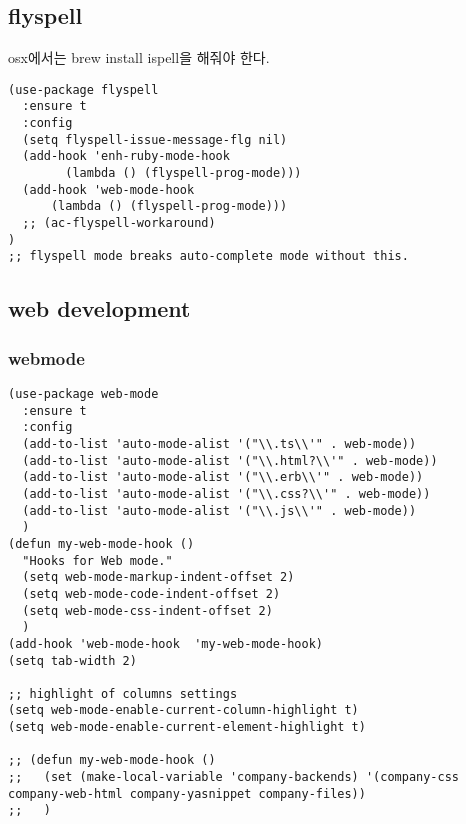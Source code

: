 \documentclass[11pt]{article}
\begin{document}
\subsection*{flyspell}
\label{sec:org152111b}
osx에서는 brew install ispell을 해줘야 한다.
\begin{verbatim}
(use-package flyspell
  :ensure t
  :config
  (setq flyspell-issue-message-flg nil)
  (add-hook 'enh-ruby-mode-hook
	    (lambda () (flyspell-prog-mode)))
  (add-hook 'web-mode-hook
	  (lambda () (flyspell-prog-mode)))
  ;; (ac-flyspell-workaround)
)
;; flyspell mode breaks auto-complete mode without this.

\end{verbatim}
\subsection*{web development}
\label{sec:org84634b5}

\subsubsection*{webmode}
\label{sec:orgcf4c61b}
\begin{verbatim}
(use-package web-mode
  :ensure t
  :config
  (add-to-list 'auto-mode-alist '("\\.ts\\'" . web-mode))
  (add-to-list 'auto-mode-alist '("\\.html?\\'" . web-mode))
  (add-to-list 'auto-mode-alist '("\\.erb\\'" . web-mode))
  (add-to-list 'auto-mode-alist '("\\.css?\\'" . web-mode))
  (add-to-list 'auto-mode-alist '("\\.js\\'" . web-mode))
  )
(defun my-web-mode-hook ()
  "Hooks for Web mode."
  (setq web-mode-markup-indent-offset 2)
  (setq web-mode-code-indent-offset 2)
  (setq web-mode-css-indent-offset 2)
  )
(add-hook 'web-mode-hook  'my-web-mode-hook)    
(setq tab-width 2)

;; highlight of columns settings
(setq web-mode-enable-current-column-highlight t)
(setq web-mode-enable-current-element-highlight t)

;; (defun my-web-mode-hook ()
;;   (set (make-local-variable 'company-backends) '(company-css company-web-html company-yasnippet company-files))
;;   )
\end{verbatim}
\end{document}
